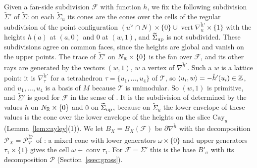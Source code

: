 Given a fan-side subdivision $\mathcal F$ with function $h$, we fix the following subdivision $\widetilde\Sigma'$ of $\widetilde\Sigma$:
on each $\widetilde\Sigma_u$ its cones are the cones over the cells of the regular subdivision of the point configuration
$(u^\vee\cap N)\times\{0\}\cup\operatorname{vert}\nabla^{\check h'}_u\times\{1\}$ with the heights $h(a)$ at $(a,0)$ and $0$
at $(w,1)$, and $\widetilde\Sigma_{\rm up}$ is not subdivided. These subdivisions agree on common faces, since the heights
are global and vanish on the upper points. The trace of $\widetilde\Sigma'$ on $N_\mathbb R\times\{0\}$ is the fan over
$\mathcal F$, and its other rays are generated by the vectors $(w,1)$, $w$ a vertex of $\nabla^{\check h'}$. Such a $w$ is a
lattice point: it is $\nabla^{\check h'}_\tau$ for a tetrahedron $\tau=\{u_1,\dots,u_4\}$ of $\mathcal T$, so $\langle
u_i,w\rangle=-\check h'(u_i)\in\mathbb Z$, and $u_1,\dots,u_4$ is a basis of $M$ because $\mathcal T$ is unimodular. So $(w,1)$
is primitive, and $\widetilde\Sigma'$ is good for $\mathcal F$ in the sense of \cite[Def.~3.8]{Gross2005}. It is the
subdivision of \cite[Rem.~3.18]{Gross2005} determined by the values $h$ on $N_\mathbb R\times\{0\}$ and $0$ on
$\widetilde\Sigma_{\rm up}$, because on $\widetilde\Sigma_u$ the lower envelope of these values is the cone over the lower
envelope of the heights on the slice $\mathrm{Cay}_u$ (Lemma~\ref{lem:cayley}(1)). We let $B_X=B_X(\mathcal F)$ be
$\partial\nabla^{\check h}$ with the decomposition $\mathscr P_X=\mathscr P^{\widetilde\Sigma'}_\nabla$ of
\cite[Def.~3.13]{Gross2005}: a mixed cone with lower generators $\omega\times\{0\}$ and upper generators
$\tau_1\times\{1\}$ gives the cell $\omega+\operatorname{conv}\tau_1$. For $\mathcal F=\Sigma'$ this is the base
$B'_\sigma$ with its decomposition $\mathscr P$ (Section~\ref{ssec:gross}).

